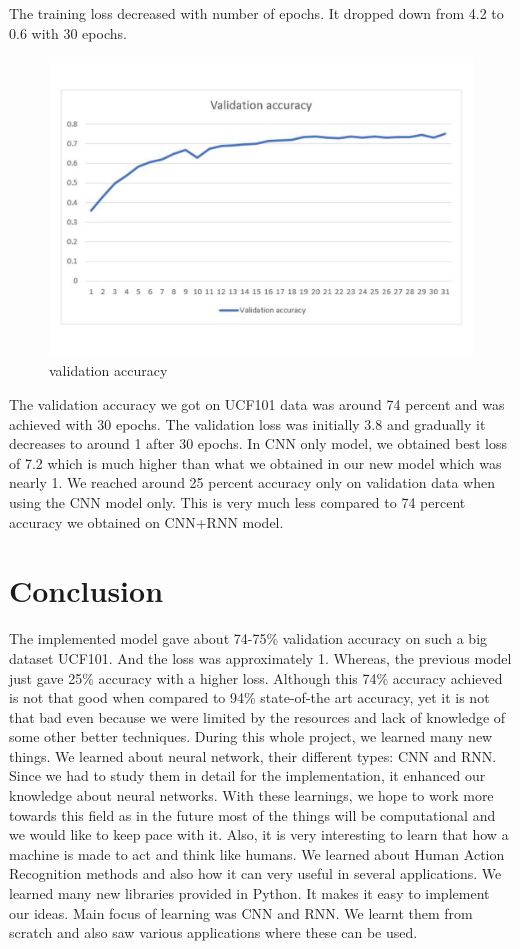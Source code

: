 \documentclass[a4paper,12pt]{article}
\begin{document}
The training loss decreased with number of epochs. It dropped down from 4.2 to 0.6 with 30 epochs.
\begin{figure}[H]
    \centering
    \includegraphics[width=1\textwidth]{validation_accuracy_init-converted}
    \caption{validation accuracy}
    \label{fig:my_label}
\end{figure}
The validation accuracy we got on UCF101 data was around 74 percent and was achieved with 30 epochs. The validation loss was initially 3.8 and gradually it decreases to around 1 after 30 epochs. In CNN only model, we obtained best loss of 7.2 which is much higher than what we obtained in our new model which was nearly 1.
We reached around 25 percent accuracy only on validation data when using the CNN model only. This is very much less compared to 74 percent accuracy we obtained on CNN+RNN model.
\section{Conclusion}
The implemented model gave about 74-75\% validation accuracy on such a big dataset UCF101. And the loss was approximately 1. Whereas, the previous model just gave 25\% accuracy with a higher loss. Although this 74\% accuracy achieved is not that good when compared to 94\% state-of-the art accuracy, yet it is not that bad even because we were limited by the resources and lack of knowledge of some other better techniques.
During this whole project, we learned many new things.
We learned about neural network, their different types: CNN and RNN. Since we had to study them in detail for the implementation, it enhanced our knowledge about neural networks. With these learnings, we hope to work more towards this field as in the future most of the things will be computational and we would like to keep pace with it. Also, it is very interesting to learn that how a machine is made to act and think like humans. We learned about Human Action Recognition methods and also how it can very useful in several applications. We learned many new libraries provided in Python. It makes it easy to implement our ideas. Main focus of learning was CNN and RNN. We learnt them from scratch and also saw various applications where these can be used.
\newpage

 
\end{document}
